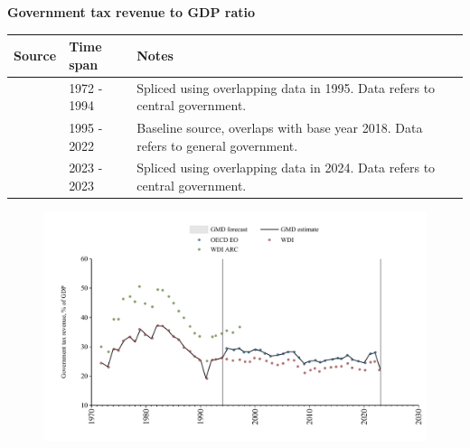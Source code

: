 \documentclass[12pt,a4paper,landscape]{article}
\begin{document}
\begin{adjustbox}{max totalsize={\paperwidth}{\paperheight},center}
\begin{minipage}[t][\textheight][t]{\textwidth}
\vspace*{0.5cm}
{}
\begin{center}
{\Large\bfseries Government tax revenue to GDP ratio}
\end{center}
\vspace{0.5cm}
\begin{table}[H]
\centering
\small
\begin{tabular}{|l|l|l|}
\hline
\textbf{Source} & \textbf{Time span} & \textbf{Notes} \\
\hline
\rowcolor{white}\cite{WDI}& 1972 - 1994 &Spliced using overlapping data in 1995. Data refers to central government.\\
\rowcolor{lightgray}\cite{OECD_EO}& 1995 - 2022 &Baseline source, overlaps with base year 2018. Data refers to general government.\\
\rowcolor{white}\cite{WDI}& 2023 - 2023 &Spliced using overlapping data in 2024. Data refers to central government.\\
\hline
\end{tabular}
\end{table}
\begin{figure}[H]
\centering
\includegraphics[width=\textwidth,height=0.6\textheight,keepaspectratio]{graphs/ISR_govtax_GDP.pdf}
\end{figure}
\end{minipage}
\end{adjustbox}
\end{document}

